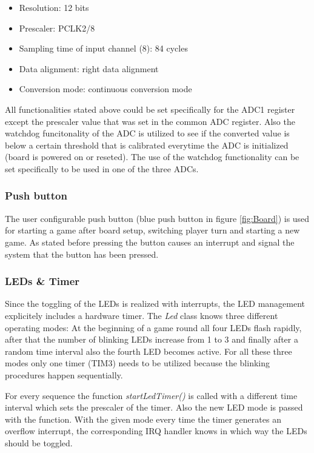\begin{itemize}
  \item Resolution: 12 bits
  \item Prescaler: PCLK2/8
  \item Sampling time of input channel (8): 84 cycles
  \item Data alignment: right data alignment
  \item Conversion mode: continuous conversion mode
\end{itemize}
All functionalities stated above could be set specifically for the ADC1 register except the prescaler value that was set in the common ADC register. Also the watchdog funcitonality of the ADC is utilized to see if the converted value is below a certain threshold that is calibrated everytime the ADC is initialized (board is powered on or reseted). The use of the watchdog functionality can be set specifically to be used in one of the three ADCs.

\subsubsection{Push button}
The user configurable push button (blue push button in figure \ref{fig:Board}) is used for starting a game after board setup, switching player turn and starting a new game. As stated before pressing the button causes an interrupt and signal the system that the button has been pressed. 


\subsubsection{LEDs \& Timer}
Since the toggling of the LEDs is realized with interrupts, the LED management explicitely includes a hardware timer. The \emph{Led} class knows three different operating modes: At the beginning of a game round all four LEDs flash rapidly, after that the number of blinking LEDs increase from 1 to 3 and finally after a random time interval also the fourth LED becomes active. For all these three modes only one timer (TIM3) needs to be utilized because the blinking procedures happen sequentially.\\
\par
For every sequence the function \emph{startLedTimer()} is called with a different time interval which sets the prescaler of the timer. Also the new LED mode is passed with the function. With the given mode every time the timer generates an overflow interrupt, the corresponding IRQ handler knows in which way the LEDs should be toggled.

